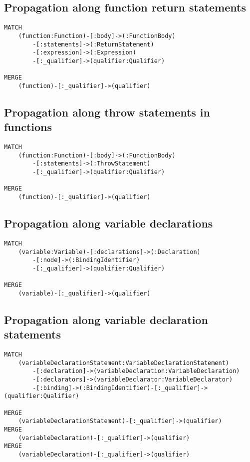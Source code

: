 \subsection{Propagation along function return statements}
\begin{lstlisting}[language=Cypher]
MATCH
    (function:Function)-[:body]->(:FunctionBody)
        -[:statements]->(:ReturnStatement)
        -[:expression]->(:Expression)
        -[:_qualifier]->(qualifier:Qualifier)

MERGE
    (function)-[:_qualifier]->(qualifier)
\end{lstlisting}


\subsection{Propagation along throw statements in functions}
\begin{lstlisting}[language=Cypher]
MATCH
    (function:Function)-[:body]->(:FunctionBody)
        -[:statements]->(:ThrowStatement)
        -[:_qualifier]->(qualifier:Qualifier)

MERGE
    (function)-[:_qualifier]->(qualifier)
\end{lstlisting}


\newpage
\subsection{Propagation along variable declarations}
\begin{lstlisting}[language=Cypher]
MATCH
    (variable:Variable)-[:declarations]->(:Declaration)
        -[:node]->(:BindingIdentifier)
        -[:_qualifier]->(qualifier:Qualifier)

MERGE
    (variable)-[:_qualifier]->(qualifier)
\end{lstlisting}


\subsection{Propagation along variable declaration statements}
\begin{lstlisting}[language=Cypher]
MATCH
    (variableDeclarationStatement:VariableDeclarationStatement)
        -[:declaration]->(variableDeclaration:VariableDeclaration)
        -[:declarators]->(variableDeclarator:VariableDeclarator)
        -[:binding]->(:BindingIdentifier)-[:_qualifier]->(qualifier:Qualifier)

MERGE
    (variableDeclarationStatement)-[:_qualifier]->(qualifier)
MERGE
    (variableDeclaration)-[:_qualifier]->(qualifier)
MERGE
    (variableDeclaration)-[:_qualifier]->(qualifier)
\end{lstlisting}


